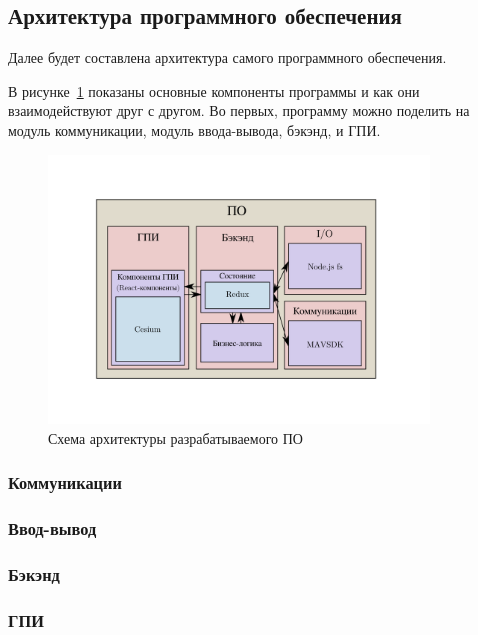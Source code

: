 \documentclass[specification,annotation]{itmo-student-thesis}
\begin{document}
\subsection{Архитектура программного обеспечения}\label{sec:archsys}

Далее будет составлена архитектура самого программного обеспечения.

В рисунке~\ref{pic:diag-arch-prog} показаны основные компоненты программы и как
они взаимодействуют друг с другом. Во первых, программу можно поделить на модуль
коммуникации, модуль ввода-вывода, бэкэнд, и ГПИ.

\begin{figure}[!h]
  \caption{Схема архитектуры разрабатываемого ПО}\label{pic:diag-arch-prog}
  \centering
  \includegraphics[width=0.9\textwidth]{diag-arch-prog}
\end{figure}

\subsubsection{Коммуникации}\label{subsubsec:io}

\subsubsection{Ввод-вывод}\label{subsubsec:io}

\subsubsection{Бэкэнд}\label{subsubsec:io}

\subsubsection{ГПИ}\label{subsubsec:io}
\end{document}
